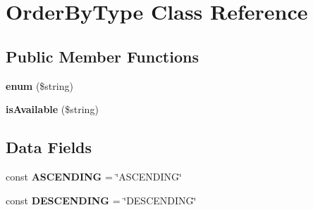 \hypertarget{class_order_by_type}{\section{Order\+By\+Type Class Reference}
\label{class_order_by_type}
}
\subsection*{Public Member Functions}
\begin{DoxyCompactItemize}
\item 
\hypertarget{class_order_by_type_a7967c6e825979f8b2faefba3d95c3821}{{\bfseries enum} (\$string)}\label{class_order_by_type_a7967c6e825979f8b2faefba3d95c3821}

\item 
\hypertarget{class_order_by_type_a30537daeb912ea3e348c579c4f930841}{{\bfseries is\+Available} (\$string)}\label{class_order_by_type_a30537daeb912ea3e348c579c4f930841}

\end{DoxyCompactItemize}
\subsection*{Data Fields}
\begin{DoxyCompactItemize}
\item 
\hypertarget{class_order_by_type_a4eb6965f9c46bb5bc363e597470da340}{const {\bfseries A\+S\+C\+E\+N\+D\+I\+N\+G} = \char`\"{}A\+S\+C\+E\+N\+D\+I\+N\+G\char`\"{}}\label{class_order_by_type_a4eb6965f9c46bb5bc363e597470da340}

\item 
\hypertarget{class_order_by_type_ae9122b532d9ebc38e2096506761d13f4}{const {\bfseries D\+E\+S\+C\+E\+N\+D\+I\+N\+G} = \char`\"{}D\+E\+S\+C\+E\+N\+D\+I\+N\+G\char`\"{}}\label{class_order_by_type_ae9122b532d9ebc38e2096506761d13f4}

\end{DoxyCompactItemize}
